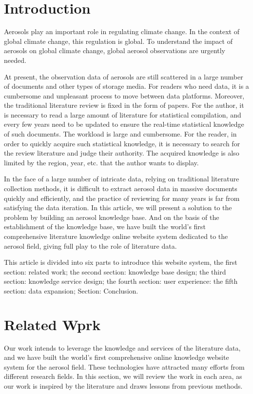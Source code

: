 \section{Introduction}

Aerosols play an important role in regulating climate change. In the context of global climate change, this regulation is global. To understand the impact of aerosols on global climate change, global aerosol observations are urgently needed.

At present, the observation data of aerosols are still scattered in a large number of documents and other types of storage media. For readers who need data, it is a cumbersome and unpleasant process to move between data platforms. Moreover, the traditional literature review is fixed in the form of papers. For the author, it is necessary to read a large amount of literature for statistical compilation, and every few years need to be updated to ensure the real-time statistical knowledge of such documents. The workload is large and cumbersome. For the reader, in order to quickly acquire such statistical knowledge, it is necessary to search for the review literature and judge their authority. The acquired knowledge is also limited by the region, year, etc. that the author wants to display.

In the face of a large number of intricate data, relying on traditional literature collection methods, it is difficult to extract aerosol data in massive documents quickly and efficiently, and the practice of reviewing for many years is far from satisfying the data iteration. In this article, we will present a solution to the problem by building an aerosol knowledge base. And on the basis of the establishment of the knowledge base, we have built the world's first comprehensive literature knowledge online website system dedicated to the aerosol field, giving full play to the role of literature data.

This article is divided into six parts to introduce this website system, the first section: related work; the second section: knowledge base design; the third section: knowledge service design; the fourth section: user experience: the fifth section: data expansion; Section: Conclusion.

\section{Related Wprk}
Our work intends to leverage the knowledge and services of the literature data, and we have built the world's first comprehensive online knowledge website system for the aerosol field. These technologies have attracted many efforts from different research fields. In this section, we will review the work in each area, as our work is inspired by the literature and draws lessons from previous methods.


